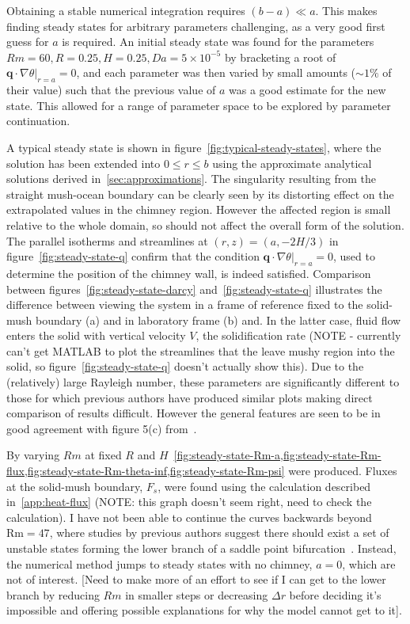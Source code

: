 \documentclass[11pt]{proc}
\begin{document}
Obtaining a stable numerical integration requires $(b-a) \ll a$. This makes finding steady states for arbitrary parameters challenging, as a very good first guess for $a$ is required. An initial steady state was found for the parameters $Rm = 60, R=0.25, H=0.25, Da=5\times 10^{-5}$ by bracketing a root of $\left. \mathbf{q} \cdot \nabla \theta \right|_{r=a} = 0$, and each parameter was then varied by small amounts ($\sim 1\%$ of their value) such that the previous value of $a$ was a good estimate for the new state. This allowed for a range of parameter space to be explored by parameter continuation.

A typical steady state is shown in figure~\ref{fig:typical-steady-states}, where the solution has been extended into $0 \le r \le b$ using the approximate analytical solutions derived in~\autoref{sec:approximations}. The singularity resulting from the straight mush-ocean boundary can be clearly seen by its distorting effect on the extrapolated values in the chimney region. However the affected region is small relative to the whole domain, so should not affect the overall form of the solution. The parallel isotherms and streamlines at $(r, z) = (a, -2H/3)$ in figure~\ref{fig:steady-state-q} confirm that the condition $\left. \mathbf{q} \cdot \nabla \theta \right|_{r=a} = 0$, used to determine the position of the chimney wall, is indeed satisfied. Comparison between figures~\ref{fig:steady-state-darcy} and~\ref{fig:steady-state-q} illustrates the difference between viewing the system in a frame of reference fixed to the solid-mush boundary (a) and in laboratory frame (b) and. In the latter case, fluid flow enters the solid with vertical velocity $V$, the solidification rate (NOTE - currently can't get MATLAB to plot the streamlines that the leave mushy region into the solid, so figure~\ref{fig:steady-state-q} doesn't actually show this). Due to the (relatively) large Rayleigh number, these parameters are significantly different to those for which previous authors have produced similar plots making direct comparison of results difficult. However the general features are seen to be in good agreement with figure 5(c) from~\citet*{schulze-worster-98}.

By varying $Rm$ at fixed $R$ and $H$~\cref{fig:steady-state-Rm-a,fig:steady-state-Rm-flux,fig:steady-state-Rm-theta-inf,fig:steady-state-Rm-psi} were produced. Fluxes at the solid-mush boundary, $F_s$, were found using the calculation described in~\cref{app:heat-flux} (NOTE: this graph doesn't seem right, need to check the calculation). I have not been able to continue the curves backwards beyond $\text{Rm} = 47$, where studies by previous authors suggest there should exist a set of unstable states forming the lower branch of a saddle point bifurcation~\citep*{schulze-worster-98,chung-worster-02}. Instead, the numerical method jumps to steady states with no chimney, $a=0$, which are not of interest. [Need to make more of an effort to see if I can get to the lower branch by reducing $Rm$ in smaller steps or decreasing $\Delta r$ before deciding it's impossible and offering possible explanations for why the model cannot get to it].
\end{document}
